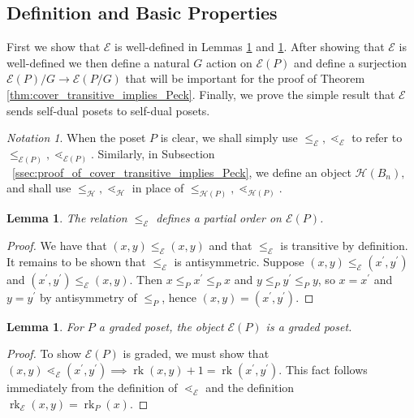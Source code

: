 \documentclass[10 pt]{amsart}
\theoremstyle{plain}
\newtheorem{lem}[thm]{Lemma}
\theoremstyle{definition}
\theoremstyle{remark}
\newtheorem*{note*}{Notation}
\numberwithin{equation}{section}
\newcommand\ssec{\subsection}
\newcommand\rk{\operatorname{rk}}
\begin{document}
\ssec{Definition and Basic Properties}\label{ssec:definition_and_basic_properties}
First we show that $\mathcal{E}$ is well-defined in Lemmas \ref{lem:f_partial_order} and \ref{lem:FP_graded_poset}.  After showing that $\mathcal E$ is well-defined we then define a natural $G$ action on $\mathcal E(P)$ and define a surjection $\mathcal E(P)/G\rightarrow \mathcal E(P/G)$ that will be important for the proof of Theorem \ref{thm:cover_transitive_implies_Peck}. Finally, we prove the simple result that $\mathcal E$ sends self-dual posets to self-dual posets.

\begin{note*}
When the poset $P$ is clear, we shall simply use $\leq_{\mathcal E},\lessdot_{\mathcal E}$ to refer to $\leq_{\mathcal E(P)},\lessdot_{\mathcal E(P)}.$ Similarly, in Subsection ~\ref{ssec:proof_of_cover_transitive_implies_Peck}, we define an object $\mathcal H(B_n),$ and shall use $\leq_{\mathcal H},\lessdot_{\mathcal H}$ in place of $\leq_{\mathcal H(P)},\lessdot_{\mathcal H(P)}.$
\end{note*}

\begin{lem}\label{lem:f_partial_order}
The relation $\le_{\mathcal E}$ defines a partial order on $\mathcal E(P)$.
\end{lem}

\begin{proof}
We have that $(x, y)\le_{\mathcal E} (x, y)$ and that $\le_{\mathcal E}$ is transitive by definition.  It remains to be shown that $\le_{\mathcal E}$ is antisymmetric.  Suppose $(x, y)\le_{\mathcal E} (x^\prime, y^\prime)$ and $(x^\prime, y^\prime)\le_{\mathcal E} (x, y)$.  Then $x\le_P x^\prime \le_P x$ and $y\le_P y^\prime \le_P y$, so $x = x^\prime$ and $y=y^\prime$ by antisymmetry of $\le_P$, hence $(x, y) = (x^\prime, y^\prime)$.
\end{proof}

\begin{lem}\label{lem:FP_graded_poset}
For $P$ a graded poset, the object $\mathcal E(P)$ is a graded poset.
\end{lem}

\begin{proof}
To show $\mathcal E(P)$ is graded, we must show that $(x, y) \lessdot_{\mathcal E} (x^\prime, y^\prime) \implies \rk(x, y)+1 = \rk(x^\prime , y^\prime)$.  This fact follows immediately from the definition of $\lessdot_{\mathcal E}$ and the definition $\rk_{\mathcal E}(x, y) = \rk_P(x)$.
\end{proof}
\end{document}
